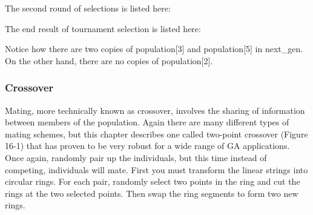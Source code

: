 The second round of selections is listed here:


The end result of tournament selection is listed here:


Notice how there are two copies of \textsf{population[3]} and
\textsf{population[5]} in \textsf{next\_gen}. On the other hand, there
are no copies of \textsf{population[2]}.

\subsubsection{Crossover}
Mating, more technically known as crossover, involves the sharing of
information between members of the population. Again there are many
different types of mating schemes, but this chapter describes one
called two-point crossover (Figure 16-1) that has proven to be very
robust for a wide range of GA applications. Once again, randomly pair
up the individuals, but this time instead of competing, individuals
will mate. First you must transform the linear strings into circular
rings. For each pair, randomly select two points in the ring and cut
the rings at the two selected points. Then swap the ring segments to
form two new rings.\\


